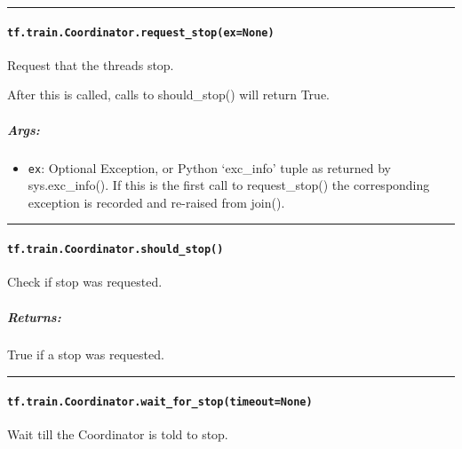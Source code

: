 \begin{center}\rule{0.5\linewidth}{\linethickness}\end{center}

\paragraph{\texorpdfstring{\texttt{tf.train.Coordinator.request\_stop(ex=None)}
}{tf.train.Coordinator.request\_stop(ex=None) }}\label{tf.train.coordinator.requestux5fstopexnone}

Request that the threads stop.

After this is called, calls to should\_stop() will return True.

\subparagraph{Args: }\label{args-24}

\begin{itemize}
\tightlist
\item
  \texttt{ex}: Optional Exception, or Python `exc\_info' tuple as
  returned by sys.exc\_info(). If this is the first call to
  request\_stop() the corresponding exception is recorded and re-raised
  from join().
\end{itemize}

\begin{center}\rule{0.5\linewidth}{\linethickness}\end{center}

\paragraph{\texorpdfstring{\texttt{tf.train.Coordinator.should\_stop()}
}{tf.train.Coordinator.should\_stop() }}\label{tf.train.coordinator.shouldux5fstop}

Check if stop was requested.

\subparagraph{Returns: }\label{returns-16}

True if a stop was requested.

\begin{center}\rule{0.5\linewidth}{\linethickness}\end{center}

\paragraph{\texorpdfstring{\texttt{tf.train.Coordinator.wait\_for\_stop(timeout=None)}
}{tf.train.Coordinator.wait\_for\_stop(timeout=None) }}\label{tf.train.coordinator.waitux5fforux5fstoptimeoutnone}

Wait till the Coordinator is told to stop.

